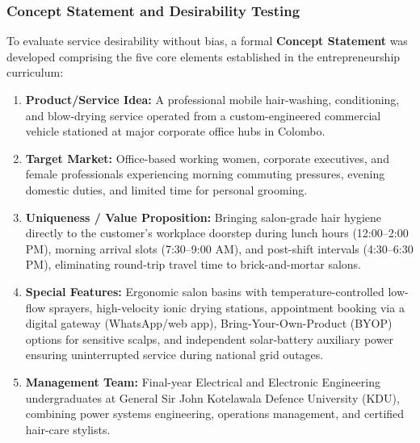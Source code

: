 \subsubsection{Concept Statement and Desirability Testing}
To evaluate service desirability without bias, a formal \textbf{Concept Statement} was developed comprising the five core elements established in the entrepreneurship curriculum:
\begin{enumerate}[leftmargin=1.8em, itemsep=0.15em]
    \item \textbf{Product/Service Idea:} A professional mobile hair-washing, conditioning, and blow-drying service operated from a custom-engineered commercial vehicle stationed at major corporate office hubs in Colombo.
    \item \textbf{Target Market:} Office-based working women, corporate executives, and female professionals experiencing morning commuting pressures, evening domestic duties, and limited time for personal grooming.
    \item \textbf{Uniqueness / Value Proposition:} Bringing salon-grade hair hygiene directly to the customer's workplace doorstep during lunch hours (12:00--2:00 PM), morning arrival slots (7:30--9:00 AM), and post-shift intervals (4:30--6:30 PM), eliminating round-trip travel time to brick-and-mortar salons.
    \item \textbf{Special Features:} Ergonomic salon basins with temperature-controlled low-flow sprayers, high-velocity ionic drying stations, appointment booking via a digital gateway (WhatsApp/web app), Bring-Your-Own-Product (BYOP) options for sensitive scalps, and independent solar-battery auxiliary power ensuring uninterrupted service during national grid outages.
    \item \textbf{Management Team:} Final-year Electrical and Electronic Engineering undergraduates at General Sir John Kotelawala Defence University (KDU), combining power systems engineering, operations management, and certified hair-care stylists.
\end{enumerate}

